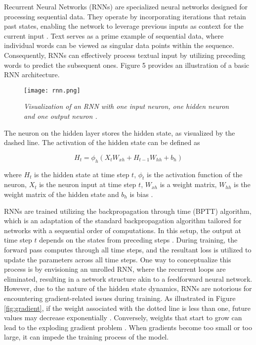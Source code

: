 Recurrent Neural Networks (RNNs) are specialized neural networks designed for processing sequential data. They operate by incorporating iterations that retain past states, enabling the network to leverage previous inputs as context for the current input \cite{schmidt2019recurrent}. Text serves as a prime example of sequential data, where individual words can be viewed as singular data points within the sequence. Consequently, RNNs can effectively process textual input by utilizing preceding words to predict the subsequent ones. Figure 5 provides an illustration of a basic RNN architecture.


\begin{figure}[H]
    \centering
    \texttt{[image: rnn.png]}
    \caption[Visualization of an RNN \cite{lipton2015critical}.]{
        \it{Visualization of an RNN with one input neuron, one hidden neuron and
            one output neuron \cite{lipton2015critical}.}
    }
    \label{fig:rnn}
\end{figure}

The neuron on the hidden layer stores the hidden state, as visualized by the dashed
line. The activation of the hidden state can be defined as

\begin{equation}
    H_t = \phi_h(X_tW_{xh} + H_{t-1}W_{hh} + b_h)
\end{equation}

where \(H_t\) is the hidden state at time step \(t\), \(\phi_t\) is the activation function of the neuron, \(X_t\) is the neuron input at time step \(t\), \(W_{xh}\) is a weight matrix, \(W_{hh}\) is the weight matrix of the hidden state and \(b_h\) is bias \cite{schmidt2019recurrent}.

RNNs are trained utilizing the backpropagation through time (BPTT) algorithm, which is an adaptation of the standard backpropagation algorithm tailored for networks with a sequential order of computations. In this setup, the output at time step \(t\) depends on the states from preceding steps \cite{58337}. During training, the forward pass computes through all time steps, and the resultant loss is utilized to update the parameters across all time steps. One way to conceptualize this process is by envisioning an unrolled RNN, where the recurrent loops are eliminated, resulting in a network structure akin to a feedforward neural network. However, due to the nature of the hidden state dynamics, RNNs are notorious for encountering gradient-related issues during training. As illustrated in Figure \ref{fig:gradient}, if the weight associated with the dotted line is less than one, future values may decrease exponentially \cite{lipton2015critical}. Conversely, weights that start to grow can lead to the exploding gradient problem \cite{schmidt2019recurrent}. When gradients become too small or too large, it can impede the training process of the model.


